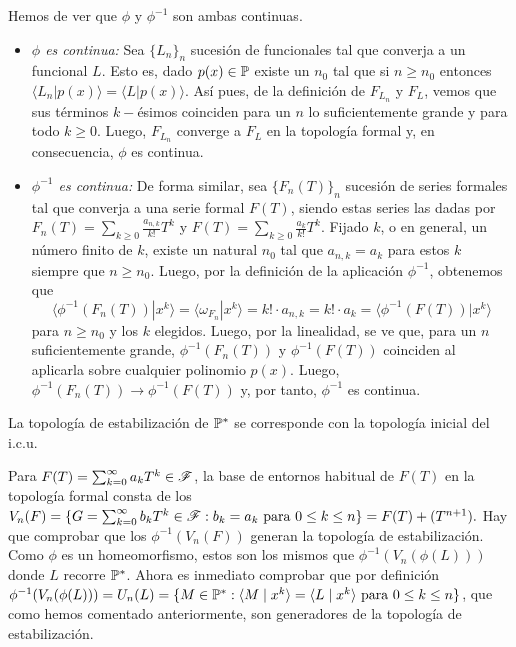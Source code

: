 \begin{demo} Hemos de ver que $\phi$ y $\phi^{-1}$ son ambas continuas.
    \begin{itemize}
        \item \textit{$\phi$ es continua:} Sea $\{L_n\}_{n}$ sucesión de funcionales tal que converja a un funcional $L$. Esto es, dado $p(x) \in \mathbb{P}$ existe un $n_0$ tal que si $n \geq n_0$ entonces $\langle L_n | p(x) \rangle = \langle L | p(x) \rangle$. Así pues, de la definición de $F_{L_n}$ y $F_{L}$, vemos que sus términos $k-$ésimos coinciden para un $n$ lo suficientemente grande y para todo $k \geq 0$. Luego, $F_{L_n}$ converge a $F_L$ en la topología formal y, en consecuencia, $\phi$ es continua.
        \item \textit{$\phi^{-1}$ es continua:} De forma similar, sea $\{F_n(T)\}_{n}$ sucesión de series formales tal que converja a una serie formal $F(T)$, siendo estas series las dadas por $F_n(T) = \sum_{k\geq 0} \frac{a_{n, k}}{k!}T^k$ y $F(T) = \sum_{k\geq 0} \frac{a_{k}}{k!}T^k $. Fijado $k$, o en general, un número finito de $k$, existe un natural $n_0$ tal que $a_{n,k} = a_k$ para estos $k$ siempre que $n \geq n_0$. Luego, por la definición de la aplicación $\phi^{-1}$, obtenemos que
    \begin{equation*}
        \langle \phi^{-1}(F_n(T)) | x^k \rangle = \langle \omega_{F_n} | x^k \rangle = k! \cdot a_{n,k} = k! \cdot a_k = \langle \phi^{-1}(F(T)) | x^k \rangle
    \end{equation*}
    para $n \geq n_0$ y los $k$ elegidos. Luego, por la linealidad, se ve que, para un $n$ suficientemente grande, $\phi^{-1}(F_n(T))$ y $\phi^{-1}(F(T))$ coinciden al aplicarla sobre cualquier polinomio $p(x)$. Luego, $\phi^{-1}(F_n(T)) \longrightarrow \phi^{-1}(F(T))$ y, por tanto, $\phi^{-1}$ es continua. \qedhere 
    \end{itemize} 
\end{demo}

\begin{teorema}\label{topologia formal equivalente a topologia de estabilizacion}
    La topología de estabilización de $\mathbb{P}^*$ se corresponde con la topología inicial del i.c.u.
\end{teorema}


\begin{demo}
Para $F(T) = \sum_{k=0}^{\infty} a_{k} T^{k} \in \mathscr{F}$, la base de entornos habitual de $F(T)$ en la topología formal consta de los 
\(
	V_{n}(F) = \{G = \sum_{k=0}^{\infty} b_{k}T^{k} \in \mathscr{F} : b_{k} = a_{k} \text{ para } 0 \leq k \leq n\} = F(T) + (T^{n+1}).
\)
Hay que comprobar que los $\phi^{-1}(V_{n}(F))$ generan la topología de estabilización. Como $\phi$ es un homeomorfismo, estos son los mismos que $\phi^{-1}(V_{n}(\phi(L)))$ donde $L$ recorre $\mathbb{P}^{*}$. Ahora es inmediato comprobar que por definición $\phi^{-1}(V_{n}(\phi(L))) = U_{n}(L) = \{M \in \mathbb{P}^{*} : \langle M \mid x^{k} \rangle = \langle L \mid x^{k} \rangle \text{ para } 0 \leq k \leq n \}$, que como hemos comentado anteriormente, son generadores de la topología de estabilización.
\end{demo}



